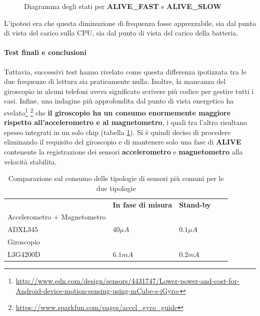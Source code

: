 \documentclass[a4paper,10pt]{memoir}
\begin{document}
\begin{figure}[ht]
\centering
\caption{Diagramma degli stati per \textbf{ALIVE\_FAST} e \textbf{ALIVE\_SLOW}}
\label{fig:scs_sm4}
\end{figure}

L'ipotesi era che questa diminuzione di frequenza fosse apprezzabile, sia dal punto di vista del carico sulla CPU, sia dal punto di vista del carico della batteria.

\paragraph{Test finali e conclusioni} Tuttavia, successivi test hanno rivelato come questa differenza ipotizzata tra le due frequenze di lettura sia praticamente nulla. Inoltre, la mancanza del giroscopio in alcuni telefoni aveva significato scrivere più codice per gestire tutti i casi. Infine, una indagine più approfondita dal punto di vista energetico ha svelato\footnote{\url{http://www.edn.com/design/sensors/4431747/Lower-power-and-cost-for-Android-device-motion-sensing-using-mCube-s-iGyro-}} \footnote{\url{https://www.sparkfun.com/pages/accel_gyro_guide}} che \textbf{il giroscopio ha un consumo enormemente maggiore rispetto all'accelerometro e al magnetometro}, i quali tra l'altro risultano spesso integrati in un solo chip (tabella \ref{table:consumosensori}). Si è quindi deciso di procedere eliminando il requisito del giroscopio e di mantenere solo una fase di \textbf{ALIVE} contenente la registrazione dei sensori \textbf{accelerometro} e \textbf{magnetometro} alla velocità stabilita.

\begin{table}[h]
\centering
\caption{Comparazione sul consumo delle tipologie di sensori più comuni per le due tipologie}
\label{table:consumosensori}
\begin{tabular}{lllll}
& \textbf{In fase di misura} & \textbf{Stand-by} & \\
Accelerometro + Magnetometro \\
ADXL345\cite{accelman} & $40 \mu A$ & $0.1 \mu A$ &  \\
Giroscopio \\
L3G4200D\cite{gyroman} & $6.1mA$ & $0.2mA$ &
\end{tabular}
\end{table}
\end{document}
